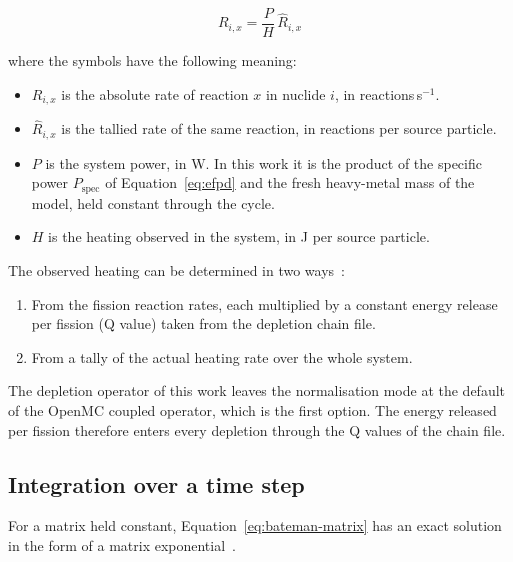 \begin{equation}
R_{i,x} = \frac{P}{H}\,\hat{R}_{i,x}
\label{eq:dep-norm}
\end{equation}

\noindent where the symbols have the following meaning:

\begin{itemize}
  \item $R_{i,x}$ is the absolute rate of reaction $x$ in nuclide $i$,
        in reactions\,s$^{-1}$.

  \item $\hat{R}_{i,x}$ is the tallied rate of the same reaction, in
        reactions per source particle.

  \item $P$ is the system power, in W. In this work it is the product of
        the specific power $P_\mathrm{spec}$ of Equation~\eqref{eq:efpd}
        and the fresh heavy-metal mass of the model, held constant
        through the cycle.

  \item $H$ is the heating observed in the system, in J per source
        particle.
\end{itemize}

The observed heating can be determined in two
ways~\cite{romano_2021_depletion}:

\begin{enumerate}
  \item From the fission reaction rates, each multiplied by a constant
        energy release per fission (Q value) taken from the depletion
        chain file.

  \item From a tally of the actual heating rate over the whole system.
\end{enumerate}

The depletion operator of this work leaves the normalisation mode at the
default of the OpenMC coupled operator, which is the first option. The
energy released per fission therefore enters every depletion through the
Q values of the chain file.

\subsection{Integration over a time step}
\label{sec:bg-dep-integ}

For a matrix held constant, Equation~\eqref{eq:bateman-matrix} has an
exact solution in the form of a matrix
exponential~\cite{romano_2021_depletion}.

